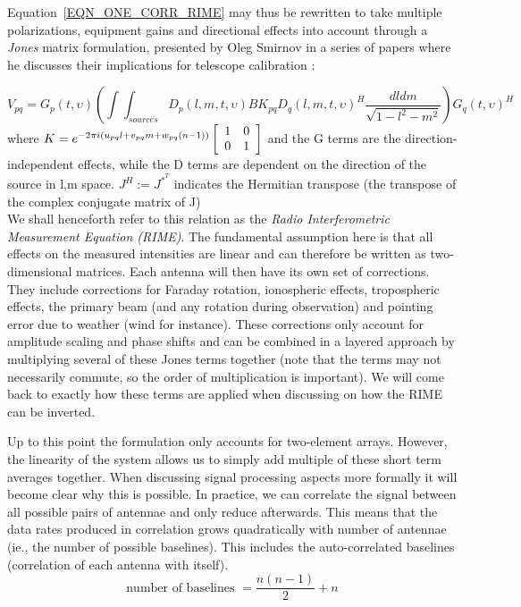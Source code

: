 Equation~\ref{EQN_ONE_CORR_RIME} may thus be rewritten to take multiple polarizations, equipment gains and directional effects into account through a \textit{Jones} matrix
formulation, presented by Oleg Smirnov in a series of papers where he discusses their implications for telescope calibration \cite{2011A&A...527A.106S,2011A&A...527A.107S,2011A&A...527A.108S,2011A&A...531A.159S}:

\begin{equation}
\label{eqn_RIME}
    V_{pq} = G_p(t,\upsilon)\left(\int\int_{sources}D_p(l,m,t,\upsilon)BK_{pq}D_q(l,m,t,\upsilon)^H\frac{dldm}{\sqrt{1-l^2-m^2}}\right)G_q(t,\upsilon)^H
\end{equation}
where $K = e^{-2\pi i(u_{pq}l+v_{pq}m+w_{pq}(n-1))}
    \left[\begin{array}{c c}
     1 & 0 \\
     0 & 1 \\
    \end{array}\right]$ and the G terms are the direction-independent effects, while the D terms are dependent on the direction of 
    the source in l,m space. $J^H:=J^{*^T}$ indicates the Hermitian transpose (the transpose of the complex conjugate matrix of J)\\
    
We shall henceforth refer to this relation as the \textit{Radio Interferometric Measurement Equation (RIME)}. 
The fundamental assumption here is that all effects on the measured intensities are linear and can therefore be 
written as two-dimensional matrices. Each antenna will then have its own set of corrections. They 
include corrections for Faraday rotation, ionospheric effects, tropospheric effects, the primary beam (and any rotation during
observation) and pointing error due to weather (wind for instance). These corrections only account for amplitude scaling and 
phase shifts and can be combined in a layered approach by multiplying several of these Jones terms together (note that the terms 
may not necessarily commute, so the order of multiplication is important). We will come back to exactly how these terms are applied
when discussing on how the RIME can be inverted.

Up to this point the formulation only accounts for two-element arrays. However, the linearity of the system allows us
to simply add multiple of these short term averages together. When discussing signal processing aspects more formally
it will become clear why this is possible. In practice, we can correlate the signal between all possible pairs of 
antennae and only reduce afterwards. This means that the data rates produced in correlation grows quadratically with 
number of antennae (ie., the number of possible baselines). This includes the auto-correlated baselines (correlation 
of each antenna with itself).
\begin{equation}
  \text{number of baselines } = \frac{n(n-1)}{2} + n
\end{equation}

